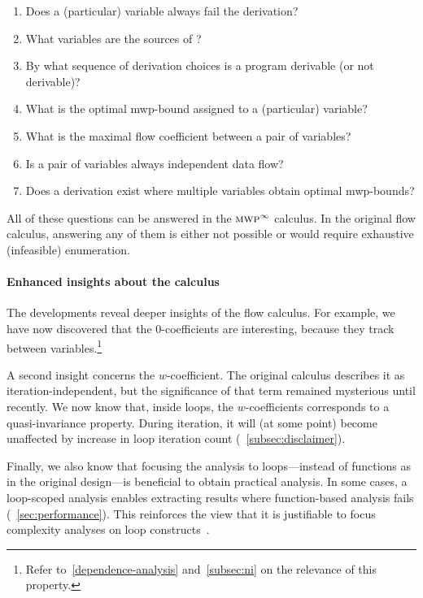\begin{enumerate}
\item Does a (particular) variable always fail the derivation?
\item What variables are the sources of ?
\item By what sequence of derivation choices is a program derivable (or not derivable)?
\item What is the optimal mwp-bound assigned to a (particular) variable?
\item What is the maximal flow coefficient between a pair of variables?
\item Is a pair of variables always independent \wrt data flow?
\item Does a derivation exist where multiple variables obtain optimal mwp-bounds?
\end{enumerate}

All of these questions can be answered in the \(\textnormal{\textsc{mwp}}^\infty\)
calculus. In the original flow calculus, answering any of them is either not
possible or would require exhaustive (infeasible) enumeration.

\paragraph*{Enhanced insights about the calculus}
The developments reveal deeper insights of the flow calculus.
For example, we have now discovered that the \(0\)-coefficients are
interesting, because they track  between
variables.\footnote{Refer to~\autoref{dependence-analysis}
and~\autoref{subsec:ni} on the relevance of this property.}

A second insight concerns the \(w\)-coefficient. The original calculus
describes it as iteration-independent,
but the significance of that term remained mysterious until recently. We now
know that, inside loops, the \(w\)-coefficients corresponds to a
quasi-invariance property. During iteration, it will (at
some point) become unaffected by increase in loop iteration count
(\cf~\autoref{subsec:disclaimer}).

Finally, we also know that focusing the analysis to loops---instead of functions
as in the original design---is beneficial to obtain practical analysis. In some
cases, a loop-scoped analysis enables extracting results where function-based
analysis fails (\cf~\autoref{sec:performance}). This reinforces the view that it
is justifiable to focus complexity analyses on loop
constructs~\cite{benamram2020}.

